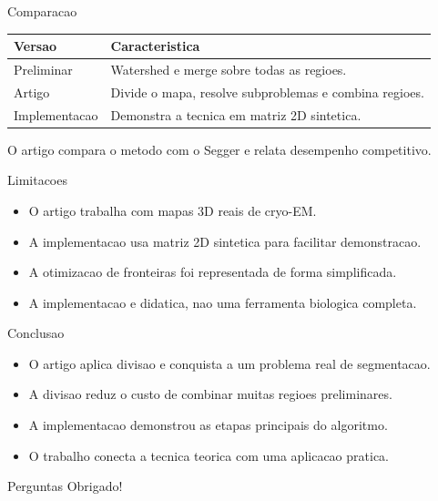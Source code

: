 \documentclass[aspectratio=169]{beamer}
\begin{document}
\begin{frame}{Comparacao}
  \begin{table}
    \centering
    \small
    \begin{tabular}{p{}p{}}
      \toprule
      \textbf{Versao} & \textbf{Caracteristica} \\
      \midrule
      Preliminar & Watershed e merge sobre todas as regioes. \\
      Artigo & Divide o mapa, resolve subproblemas e combina regioes. \\
      Implementacao & Demonstra a tecnica em matriz 2D sintetica. \\
      \bottomrule
    \end{tabular}
  \end{table}

  \vspace{0.2cm}
  \small O artigo compara o metodo com o Segger e relata desempenho competitivo.
\end{frame}

\begin{frame}{Limitacoes}
  \begin{itemize}
    \item O artigo trabalha com mapas 3D reais de cryo-EM.
    \item A implementacao usa matriz 2D sintetica para facilitar demonstracao.
    \item A otimizacao de fronteiras foi representada de forma simplificada.
    \item A implementacao e didatica, nao uma ferramenta biologica completa.
  \end{itemize}
\end{frame}

\begin{frame}{Conclusao}
  \begin{itemize}
    \item O artigo aplica divisao e conquista a um problema real de segmentacao.
    \item A divisao reduz o custo de combinar muitas regioes preliminares.
    \item A implementacao demonstrou as etapas principais do algoritmo.
    \item O trabalho conecta a tecnica teorica com uma aplicacao pratica.
  \end{itemize}
\end{frame}

\begin{frame}{Perguntas}
  \centering
  \Large Obrigado!
\end{frame}
\end{document}

